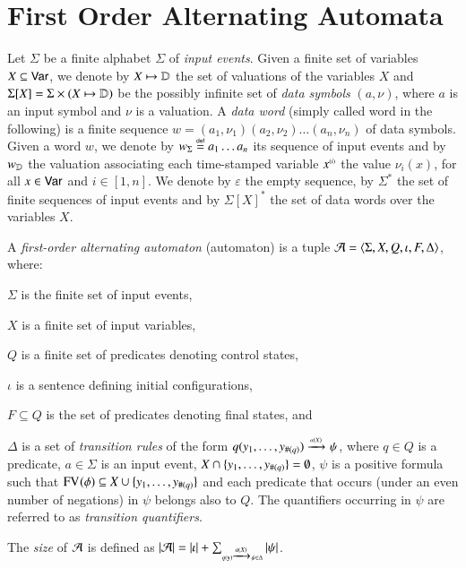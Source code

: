 \documentclass{llncs}
\begin{document}
\section{First Order Alternating Automata}

Let $\Sigma$ be a finite alphabet $\Sigma$ of \emph{input
  events}. Given a finite set of variables $X \subseteq \mathsf{Var}$, we denote by $X
\mapsto \mathbb{D}$ the set of valuations of the variables $X$ and
$\Sigma[X] = \Sigma \times (X \mapsto \mathbb{D})$ be the possibly infinite
set of \emph{data symbols} $(a,\nu)$, where $a$ is an input symbol and
$\nu$ is a valuation. A \emph{data word} (simply called word in the
following) is a finite sequence $w=(a_1,\nu_1)(a_2,\nu_2) \ldots
(a_n,\nu_n)$ of data symbols. Given a word $w$, we denote by
${w}_\Sigma \stackrel{\scriptscriptstyle{\mathsf{def}}}{=} a_1\ldots a_n$ its sequence of input events and by
${w}_{\mathbb{D}}$ the valuation associating each time-stamped variable
${x}^{\scriptscriptstyle{({i})}}$ the value $\nu_i(x)$, for all $x \in \mathsf{Var}$ and
$i\in[1,n]$. We denote by $\varepsilon$ the empty sequence, by
$\Sigma^*$ the set of finite sequences of input events and by
$\Sigma[X]^*$ the set of data words over the variables $X$.

A \emph{first-order alternating automaton} (automaton) is a tuple $\mathcal{A}
= \langle \Sigma,X,Q,\iota,F,\Delta \rangle$, where: \begin{compactitem}
\item $\Sigma$ is the finite set of input events, 
\item $X$ is a finite set of input variables, 
\item $Q$ is a finite set of predicates denoting control states, 
\item $\iota$ is a sentence defining initial configurations,
\item $F \subseteq Q$ is the set of predicates denoting final states, and 
\item $\Delta$ is a set of \emph{transition rules} of the form
  \(q(y_1,\ldots,y_{\#(q)}) \xrightarrow{{\scriptscriptstyle a(X)}}_{{\scriptstyle }} \psi\), where $q \in Q$ is
  a predicate, $a \in \Sigma$ is an input event, $X \cap
  \{ y_1,\ldots,y_{\#(q)} \} = \emptyset$, $\psi$ is a positive
  formula such that $\mathrm{FV}_{}(\phi) \subseteq X \cup
  \{ y_1,\ldots,y_{\#(q)} \}$ and each predicate that occurs (under an
  even number of negations) in $\psi$ belongs also to $Q$. The
  quantifiers occurring in $\psi$ are referred to as \emph{transition
    quantifiers}.
\end{compactitem}
The \emph{size} of $\mathcal{A}$ is defined as ${|{\mathcal{A}}|} = {|{\iota}|} +
\sum_{\scriptscriptstyle{q(\mathbf y) \xrightarrow{{\scriptscriptstyle a(X)}}_{{\scriptstyle }} \psi \in \Delta}}
{|{\psi}|}$.
\end{document}
